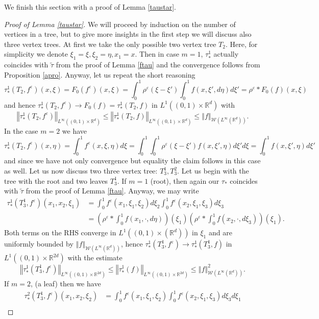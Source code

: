 \documentclass[10pt]{article}
\newcommand*{\norm}[1]{\left\Vert{#1}\right\Vert}
\newcommand{\ve}{\varepsilon}
\newcommand{\R}{\mathbb{R}}
\newcommand{\izj}{\int_{0}^{1}}
\newcommand{\W}{\mathcal{W}}
\begin{document}
We finish this section with a proof of Lemma \ref{taustar}.

\begin{proof}[Proof of Lemma \ref{taustar}]
We will proceed by induction on the number of vertices in a tree, but to give more insights in the first step we will discuss also three vertex trees. At first we take the only possible two vertex tree $T_2$. Here, for simplicity we denote $\xi_1 = \xi, \xi_2 = \eta, x_1 = x$. Then in case $m = 1$, $\tau^1_{*}$ actually coincides with $\tilde{\tau}$ from the proof of Lemma \ref{ftau} and the convergence follows from Proposition \ref{apro}. Anyway, let us repeat the short reasoning
\[
\tau_{*}^1(T_2,f^{\ve})(x,\xi) = F_{0}(f^{\ve})(x,\xi) = \izj  \rho^\ve(\xi-\xi')\izj f(x,\xi',d\eta) d\xi' = \rho^\ve * F_0(f)(x,\xi)
\]
and hence $\tau_{*}^1(T_2,f^{\ve}) \rightarrow F_0(f) = \tau^1_{*}(T_2,f)$ in $L^{1}((0,1)\times \R^d)$  with 
\[
 \norm{\tau^1_{*}(T_2,f^{\ve})}_{L^{\infty}((0,1)\times \R^d)} \leq \norm{\tau^1_{*}(T_2,f)}_{L^{\infty}((0,1)\times \R^d)} \leq \norm{f}_{\W(L^{\infty}(\R^d))}.
\]
In the case $m=2$ we have
\[
\tau_{*}^1(T_2,f^{\ve})(x,\eta) =\izj f^{\ve}(x,\xi,\eta)d\xi= \izj  \izj \rho^\ve(\xi-\xi') f(x,\xi',\eta) d\xi'd\xi = \izj f(x,\xi',\eta)d\xi'
\]
and since we have not only convergence but equality the claim follows in this case as well. 
Let us now discuss two three vertex tree: $T_3^1, T_3^2$. Let us begin with the tree with the root and two leaves  $T_3^1$. If $m=1$ (root), then again our $\tau_*$ coincides with $\tilde{\tau}$ from the proof of Lemma \ref{ftau}. Anyway, we may write
\begin{align*}
\tau_{*}^1(T_3^1,f^{\ve})(x_1,x_2,\xi_1) &= \izj f^\ve(x_1,\xi_1,\xi_2)d\xi_2 \izj f^{\ve}(x_2,\xi_1,\xi_3)d\xi_3
\\
&= \left(\rho^{\ve}* \izj f(x_1,\cdot,d\eta)\right)(\xi_1)\left(\rho^{\ve}* \izj f(x_2,\cdot,d\xi_3)\right)(\xi_1).
\end{align*}
Both terms on the RHS converge in $L^{1}((0,1)\times (\R^d))$ in $\xi_1$ and are uniformly bounded  by $\norm{f}_{\W(L^{\infty}(\R^d))}$, hence $\tau^1_{*}(T_3^1,f^{\ve}) \rightarrow \tau^1_{*}(T_3^1,f)$ in $L^{1}((0,1)\times \R^{2d})$ with the estimate
\[
 \norm{\tau^1_{*}(T^1_3,f^{\ve})}_{L^{\infty}((0,1)\times \R^{2d})} \leq \norm{\tau^1_{*}(f)}_{L^{\infty}((0,1)\times \R^{2d})} \leq \norm{f}^2_{\W(L^{\infty}(\R^d))}.
\]
If $m=2$, (a leaf) then we have
\begin{align*}
\tau_{*}^2(T_3^1,f^{\ve})(x_1,x_2,\xi_2) &= \izj f^\ve(x_1,\xi_1,\xi_2) \izj f^{\ve}(x_2,\xi_1,\xi_3)d\xi_3 d\xi_1\\

\end{align*}
\end{proof}
\end{document}
